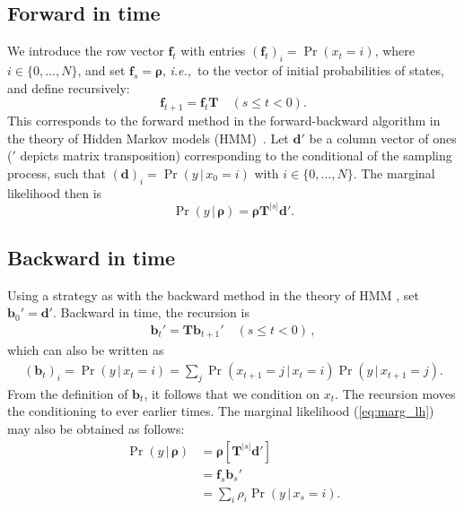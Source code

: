 \documentclass[preprint]{elsarticle}
\newcommand{\bs}[1]{\ensuremath{\boldsymbol{#1}}}
\newcommand\given{{\,|\,}}
\newcommand\eg{{\it e.g.,}}
\newcommand\ie{{\it i.e.,}}
\newcommand\x[1]{\ensuremath{x_{#1}}}
\newcommand\y{\ensuremath{y}}
\newcommand\s{\ensuremath{s}}
\newcommand\fv[1]{\ensuremath{\mathbf{f}_{#1}}}
\newcommand\bv[1]{\ensuremath{\mathbf{b}_{#1}}}
\begin{document}
\subsection{Forward in time}

We introduce the row vector $\fv{t}$ with entries $(\fv{t})_{i} = \Pr(\x{t} = i)$, where ${i \in \{0, \ldots, N\}}$, and set $\fv{\s} = \bs{\rho}$, \ie\ to the vector of initial probabilities of states, and define recursively: 
\begin{equation}
\fv{t+1} = \fv{t}\mathbf{T} \quad (\s \le t < 0).
\end{equation}
This corresponds to the forward method in the forward-backward algorithm in the theory of Hidden Markov models (HMM)~\citep[\eg][]{Rabi86,Vogl10}. Let $\mathbf{d}'$ be a column vector of ones ($'$ depicts matrix transposition) corresponding to the conditional of the sampling process, such that $(\mathbf{d})_i=\Pr(\y \given \x{0}=i)$ with ${i \in \{0, \ldots, N\}}$. The marginal likelihood then is
\begin{equation}\label{eq:marg_lh}
\Pr(\y \given \bs{\rho}) = \bs{\rho}\mathbf{T}^{|\s|}\mathbf{d}'.
\end{equation}

\subsection{Backward in time}\label{section:backward}

Using a strategy as with the backward method in the theory of HMM \citep{Rabi86,Vogl10}, set $\bv{0}'=\mathbf{d}'$. Backward in time, the recursion is
\begin{equation}
\begin{split}
\bv{t}' = \mathbf{T} \bv{t+1}' \quad (\s \le t <0)\,,
\end{split}
\end{equation}
which can also be written as
\begin{equation}\label{eq:backwards_discrete}
\begin{split}
(\bv{t})_i=\Pr(\y \given \x{t}=i) = \sum_j \Pr(\x{t+1}=j \given \x{t}=i) \Pr(\y \given \x{t+1}=j).
\end{split}
\end{equation}
From the definition of $\bv{t}$, it follows that we condition on $\x{t}$. The recursion moves the conditioning to ever earlier times. The marginal likelihood (\ref{eq:marg_lh}) may also be obtained as follows:
\begin{equation}\label{eq:marg_lh_alternative}
\begin{split}
\Pr(\y \given \bs{\rho}) &= \bs{\rho} \left[\mathbf{T}^{|\s|} \mathbf{d}'\right]\\
                         &= \fv{\s} \bv{\s}' \\
                         &= \sum_i \rho_i \Pr(\y \given \x{\s}=i).
\end{split}
\end{equation}
\end{document}
